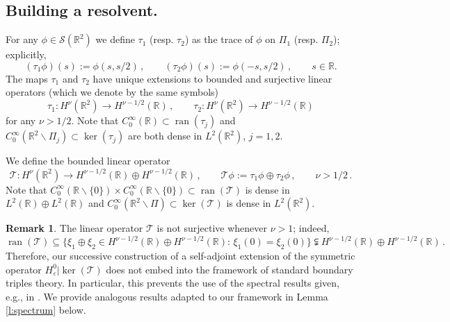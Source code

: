 \documentclass[a4paper,11pt,reqno]{amsart}
\theoremstyle{definition}
\newtheorem{remark}[theorem]{Remark}
\numberwithin{equation}{section}
\newcommand{\ran}{\operatorname{ran }}
\newcommand{\RE}{\mathbb R}
\newcommand{\Tau}{\mathcal{T}}
\renewcommand{\SS}{\mathcal S}
\newcommand{\ve}{\varepsilon}
\begin{document}
\subsection{Building a resolvent.}
For any  $\phi \in \SS(\RE^2)$ we define $\tau_1$ (resp. $\tau_2$) as the trace of $\phi$ on $\Pi_1$ (resp. $\Pi_2$); explicitly,
\[
(\tau_1\phi)(s) := \phi(s, s/2) \,, \qquad (\tau_2\phi)(s) := \phi(-s,   s/2)\,, \qquad s\in\RE .
\]
The maps $\tau_1$ and $\tau_2$ have unique extensions to bounded and surjective linear operators (which we denote by the same symbols)  
\[
\tau_1: H^\nu(\RE^2) \to H^{\nu-1/2}(\RE) \,, \qquad
\tau_2:H^\nu(\RE^2)\to H^{\nu-1/2}(\RE) 
\]
for any $\nu>1/2$. Note that  $C_0^\infty(\RE ) \subset\ran (\tau_j)$ and $C_0^\infty(\RE^2\backslash\Pi_{j} ) \subset\ker (\tau_j)$ are both dense in $L^2(\RE^2)$, $j=1,2$.

We define  the bounded linear operator 
\[
\Tau : H^\nu(\RE^2) \to H^{\nu-1/2}(\RE) \oplus H^{\nu-1/2}(\RE)\,,\qquad\Tau \phi := \tau_1\phi\oplus\tau_2\phi\,,\qquad \nu >1/2 \,.
\]
Note that $C_0^\infty(\RE\backslash\{0\})\times C_0^\infty(\RE\backslash\{0\}) \subset \ran(\Tau)$ is dense in  $L^2(\RE)\oplus L^2(\RE)$ and $C_0^\infty(\RE^2\backslash\Pi ) \subset \ker (\Tau)$ is dense in  $L^2(\RE^2)$.
\begin{remark}\label{r:Tau} The linear operator $
\Tau$ is  not surjective whenever $\nu>1$; indeed, 
\[
\ran(\Tau)\subseteq \big\{\xi_1\oplus\xi_2 \in H^{\nu-1/2}(\RE)\oplus H^{\nu-1/2}(\RE): \,\xi_1(0) = \xi_2(0)\big\}\subsetneqq H^{\nu-1/2}(\RE)\oplus H^{\nu-1/2}(\RE)\,.
\]
Therefore, our successive construction of a self-adjoint extension of the symmetric operator $H^{0}_{\ve}|\ker(\Tau)$ does not embed into the framework of standard boundary triples theory. In particular, this prevents the use of the spectral results given, e.g., in \cite[Theorem 3.3]{BGP}. We provide analogous results adapted to our framework in Lemma \ref{l:spectrum} below.
\end{remark}
\end{document}

